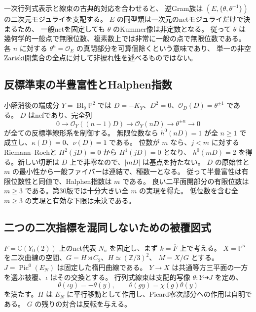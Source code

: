 一次行列式表示と線束の古典的対応を合わせると、
逆Gram族は $(E,\{\theta,\theta^{-1}\})$ の二次元モジュライを支配する。
$E$ の同型類は一次元のnetモジュライだけで決まるため、
一般netを固定しても $\theta$ のKummer像は非定数となる。
従って $\theta$ は幾何学的一般点で無限位数、複素数上では非常に一般の点で無限位数である。
各 $n$ に対する $\theta^n=\mathcal O_E$ の真閉部分を可算個除くという意味であり、
単一の非空Zariski開集合の全点に対して非捩れ性を述べるものではない。

\subsection{反標準束の半豊富性とHalphen指数}
小解消後の端成分 $Y=\operatorname{Bl}_9\mathbb P^2$ では
$D=-K_Y$、$D^2=0$、$\mathcal O_D(D)=\theta^{\pm1}$ である。
$D$ はnefであり、完全列
\[
 0\to\mathcal O_Y((n-1)D)\to\mathcal O_Y(nD)
 \to\theta^{\pm n}\to0
\]
が全ての反標準線形系を制御する。
無限位数なら $h^0(nD)=1$ が全 $n\ge1$ で成立し、$\kappa(D)=0$、$\nu(D)=1$ である。
位数が $m$ なら、$j<m$ に対するRiemann--Rochと $H^2(jD)=0$ から $H^1(jD)=0$ となり、
$h^0(mD)=2$ を得る。新しい切断は $D$ 上で非零なので、$|mD|$ は基点を持たない。
$D$ の原始性と $m$ の最小性から一般ファイバーは連結で、種数一となる。
従って半豊富性は有限位数性と同値で、Halphen指数は $m$ である。
良い二平面開部分の有限位数は $m\ge3$ である。第30版では十分大きい全 $m$ の実現を得た。
低位数を含む全 $m\ge3$ の実現と有効な下限は未決である。

\subsection{二つの二次指標を混同しないための被覆図式}
$F=\mathbb C(Y_0(2))$ 上のnet代表 $N_u$ を固定し、まず $k=\overline F$ 上で考える。
$X=\mathbb P^5$ を二次曲線の空間、$G=H\rtimes C_2$、$H\simeq(\mathbb Z/3)^2$、
$M=X/G$ とする。$J=\operatorname{Pic}^0(E_N)$ は固定した楕円曲線である。
$Y\to X$ は共通等方三平面の一方を選ぶ被覆、$\iota$ はその交換とする。
行列式線束は支配的写像 $\theta:Y\dashrightarrow J$ を定め、
\[
 \theta(\iota y)=-\theta(y),\qquad
 \theta(gy)=\chi(g)\theta(y)
\]
を満たす。$H$ は $E_N$ に平行移動として作用し、Picard零次部分への作用は自明である。
$G$ の残りの対合は反転を与える。

